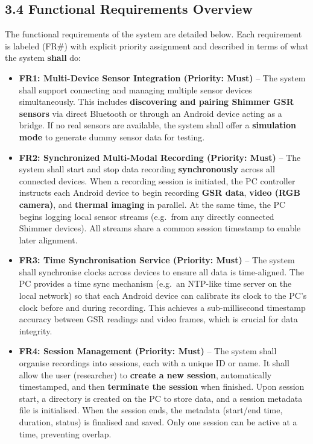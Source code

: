 \documentclass[12pt,a4paper]{article}
\begin{document}
\subsection{3.4 Functional Requirements Overview}\label{functional-requirements-overview}

The functional requirements of the system are detailed below. Each requirement is labeled (FR\#) with explicit priority assignment and described in terms of what the system \textbf{shall} do:

\begin{itemize}
\item
  \textbf{FR1: Multi-Device Sensor Integration (Priority: Must)} -- The system shall support connecting and managing multiple sensor devices simultaneously. This includes \textbf{discovering and pairing Shimmer GSR sensors} via direct Bluetooth or through an Android device acting as a bridge. If no real sensors are available, the system shall offer a \textbf{simulation mode} to generate dummy sensor data for testing.
\item
  \textbf{FR2: Synchronized Multi-Modal Recording (Priority: Must)} -- The system shall start and stop data recording \textbf{synchronously} across all connected devices. When a recording session is initiated, the PC controller instructs each Android device to begin recording \textbf{GSR data}, \textbf{video (RGB camera)}, and \textbf{thermal imaging} in parallel. At the same time, the PC begins logging local sensor streams (e.g.~from any directly connected Shimmer devices). All streams share a common session timestamp to enable later alignment.
\item
  \textbf{FR3: Time Synchronisation Service (Priority: Must)} -- The system shall synchronise clocks across devices to ensure all data is time-aligned. The PC provides a time sync mechanism (e.g.~an NTP-like time server on the local network) so that each Android device can calibrate its clock to the PC's clock before and during recording. This achieves a sub-millisecond timestamp accuracy between GSR readings and video frames, which is crucial for data integrity.
\item
  \textbf{FR4: Session Management (Priority: Must)} -- The system shall organise recordings into sessions, each with a unique ID or name. It shall allow the user (researcher) to \textbf{create a new session}, automatically timestamped, and then \textbf{terminate the session} when finished. Upon session start, a directory is created on the PC to store data, and a session metadata file is initialised. When the session ends, the metadata (start/end time, duration, status) is finalised and saved. Only one session can be active at a time, preventing overlap.

\end{itemize}
\end{document}
